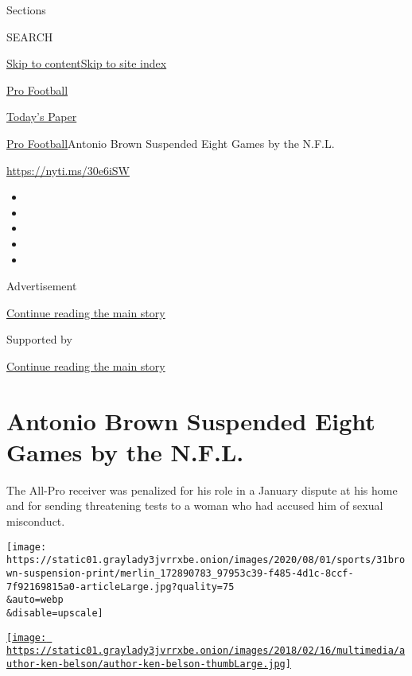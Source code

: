 Sections

SEARCH

\protect\hyperlink{site-content}{Skip to
content}\protect\hyperlink{site-index}{Skip to site index}

\href{https://www.nytimes3xbfgragh.onion/section/sports/football}{Pro
Football}

\href{https://myaccount.nytimes3xbfgragh.onion/auth/login?response_type=cookie\&client_id=vi}{}

\href{https://www.nytimes3xbfgragh.onion/section/todayspaper}{Today's
Paper}

\href{/section/sports/football}{Pro Football}\textbar{}Antonio Brown
Suspended Eight Games by the N.F.L.

\url{https://nyti.ms/30e6iSW}

\begin{itemize}
\item
\item
\item
\item
\item
\end{itemize}

Advertisement

\protect\hyperlink{after-top}{Continue reading the main story}

Supported by

\protect\hyperlink{after-sponsor}{Continue reading the main story}

\hypertarget{antonio-brown-suspended-eight-games-by-the-nfl}{%
\section{Antonio Brown Suspended Eight Games by the
N.F.L.}\label{antonio-brown-suspended-eight-games-by-the-nfl}}

The All-Pro receiver was penalized for his role in a January dispute at
his home and for sending threatening tests to a woman who had accused
him of sexual misconduct.

\texttt{[image: https://static01.graylady3jvrrxbe.onion/images/2020/08/01/sports/31brown-suspension-print/merlin\_172890783\_97953c39-f485-4d1c-8ccf-7f92169815a0-articleLarge.jpg?quality=75\\\&auto=webp\\\&disable=upscale]}

\href{https://www.nytimes3xbfgragh.onion/by/ken-belson}{\texttt{[image: https://static01.graylady3jvrrxbe.onion/images/2018/02/16/multimedia/author-ken-belson/author-ken-belson-thumbLarge.jpg]}}


